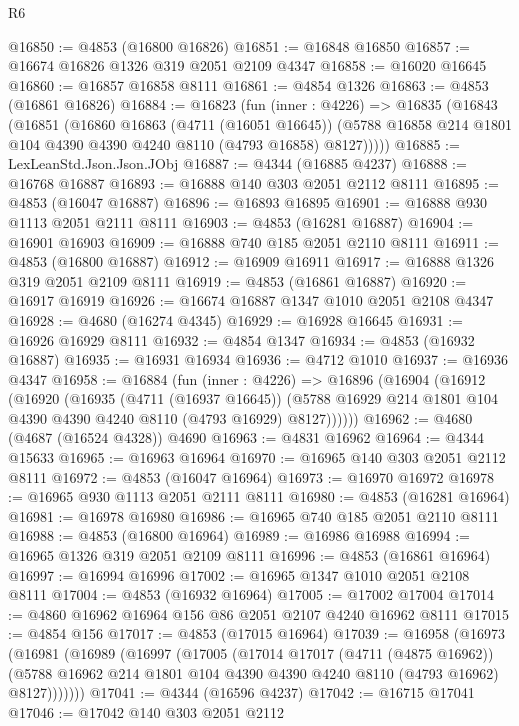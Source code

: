 \begin{lexlean}{R6}
\begin{coremodule}
@16850 := @4853 (@16800 @16826)
@16851 := @16848 @16850
@16857 := @16674 @16826 @1326 @319 @2051 @2109 @4347
@16858 := @16020 @16645
@16860 := @16857 @16858 @8111
@16861 := @4854 @1326
@16863 := @4853 (@16861 @16826)
@16884 := @16823
    (fun (inner : @4226) =>
    @16835
      (@16843
        (@16851
          (@16860
            @16863
            (@4711 (@16051 @16645))
            (@5788 @16858 @214 @1801 @104 @4390 @4390 @4240 @8110 (@4793 @16858) @8127)))))
@16885 := LexLeanStd.Json.Json.JObj
@16887 := @4344 (@16885 @4237)
@16888 := @16768 @16887
@16893 := @16888 @140 @303 @2051 @2112 @8111
@16895 := @4853 (@16047 @16887)
@16896 := @16893 @16895
@16901 := @16888 @930 @1113 @2051 @2111 @8111
@16903 := @4853 (@16281 @16887)
@16904 := @16901 @16903
@16909 := @16888 @740 @185 @2051 @2110 @8111
@16911 := @4853 (@16800 @16887)
@16912 := @16909 @16911
@16917 := @16888 @1326 @319 @2051 @2109 @8111
@16919 := @4853 (@16861 @16887)
@16920 := @16917 @16919
@16926 := @16674 @16887 @1347 @1010 @2051 @2108 @4347
@16928 := @4680 (@16274 @4345)
@16929 := @16928 @16645
@16931 := @16926 @16929 @8111
@16932 := @4854 @1347
@16934 := @4853 (@16932 @16887)
@16935 := @16931 @16934
@16936 := @4712 @1010
@16937 := @16936 @4347
@16958 := @16884
    (fun (inner : @4226) =>
    @16896
      (@16904
        (@16912
          (@16920
            (@16935
              (@4711 (@16937 @16645))
              (@5788 @16929 @214 @1801 @104 @4390 @4390 @4240 @8110 (@4793 @16929) @8127))))))
@16962 := @4680 (@4687 (@16524 @4328)) @4690
@16963 := @4831 @16962
@16964 := @4344 @15633
@16965 := @16963 @16964
@16970 := @16965 @140 @303 @2051 @2112 @8111
@16972 := @4853 (@16047 @16964)
@16973 := @16970 @16972
@16978 := @16965 @930 @1113 @2051 @2111 @8111
@16980 := @4853 (@16281 @16964)
@16981 := @16978 @16980
@16986 := @16965 @740 @185 @2051 @2110 @8111
@16988 := @4853 (@16800 @16964)
@16989 := @16986 @16988
@16994 := @16965 @1326 @319 @2051 @2109 @8111
@16996 := @4853 (@16861 @16964)
@16997 := @16994 @16996
@17002 := @16965 @1347 @1010 @2051 @2108 @8111
@17004 := @4853 (@16932 @16964)
@17005 := @17002 @17004
@17014 := @4860 @16962 @16964 @156 @86 @2051 @2107 @4240 @16962 @8111
@17015 := @4854 @156
@17017 := @4853 (@17015 @16964)
@17039 := @16958
    (@16973
      (@16981
        (@16989
          (@16997
            (@17005
              (@17014
                @17017
                (@4711 (@4875 @16962))
                (@5788 @16962 @214 @1801 @104 @4390 @4390 @4240 @8110 (@4793 @16962) @8127)))))))
@17041 := @4344 (@16596 @4237)
@17042 := @16715 @17041
@17046 := @17042 @140 @303 @2051 @2112

\end{coremodule}
\end{lexlean}
